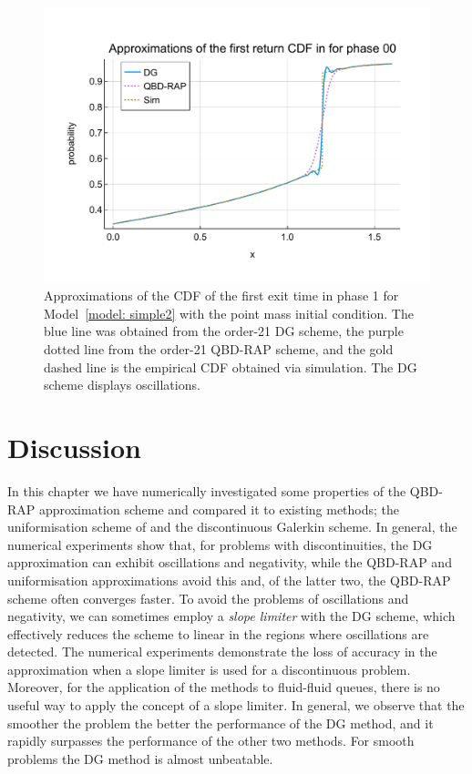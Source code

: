 \begin{figure}
	\centering
	\includegraphics[width=\textwidth]{chapter6/figs/ffq/discts/phase_4_cdf.pdf}%
	\caption{Approximations of the CDF of the first exit time in phase 1 for Model~\ref{model: simple2} with the point mass initial condition. The blue line was obtained from the order-21 DG scheme, the purple dotted line from the order-21 QBD-RAP scheme, and the gold dashed line is the empirical CDF obtained via simulation. The DG scheme displays oscillations. } 
	\label{fig: ffq2 oscillation} 
\end{figure}

\FloatBarrier
\section{Discussion}
In this chapter we have numerically investigated some properties of the QBD-RAP approximation scheme and compared it to existing methods; the uniformisation scheme of \cite{bo2013} and the discontinuous Galerkin scheme. In general, the numerical experiments show that, for problems with discontinuities, the DG approximation can exhibit oscillations and negativity, while the QBD-RAP and uniformisation approximations avoid this and, of the latter two, the QBD-RAP scheme often converges faster. To avoid the problems of oscillations and negativity, we can sometimes employ a \emph{slope limiter} with the DG scheme, which effectively reduces the scheme to linear in the regions where oscillations are detected. The numerical experiments demonstrate the loss of accuracy in the approximation when a slope limiter is used for a discontinuous problem. Moreover, for the application of the methods to fluid-fluid queues, there is no useful way to apply the concept of a slope limiter. %
In general, we observe that the smoother the problem the better the performance of the DG method, and it rapidly surpasses the performance of the other two methods. For smooth problems the DG method is almost unbeatable. 

